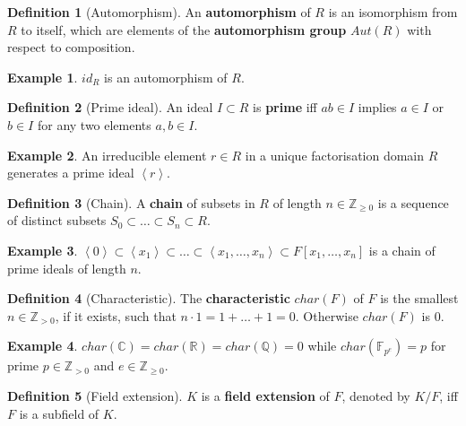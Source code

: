 \documentclass{article}
\newcommand{\F}{\mathbb{F}}
\newcommand{\Z}{\mathbb{Z}}
\newcommand{\Q}{\mathbb{Q}}
\newcommand{\R}{\mathbb{R}}
\newcommand{\C}{\mathbb{C}}
\newcommand{\rb}[1]{\left( #1 \right)}
\renewcommand{\sb}[1]{\left[ #1 \right]}
\newcommand{\ab}[1]{\left\langle #1 \right\rangle}
\theoremstyle{definition}
\newtheorem*{definition}{Definition}
\newtheorem*{example}{Example}
\begin{document}
\begin{definition}[Automorphism]
An \textbf{automorphism} of $ R $ is an isomorphism from $ R $ to itself, which are elements of the \textbf{automorphism group} $ Aut\rb{R} $ with respect to composition.
\end{definition}

\begin{example}
$ id_R $ is an automorphism of $ R $.
\end{example}

\begin{definition}[Prime ideal]
An ideal $ I \subset R $ is \textbf{prime} iff $ ab \in I $ implies $ a \in I $ or $ b \in I $ for any two elements $ a, b \in I $.
\end{definition}

\begin{example}
An irreducible element $ r \in R $ in a unique factorisation domain $ R $ generates a prime ideal $ \ab{r} $.
\end{example}

\begin{definition}[Chain]
A \textbf{chain} of subsets in $ R $ of length $ n \in \Z_{\ge 0} $ is a sequence of distinct subsets $ S_0 \subset \dots \subset S_n \subset R $.
\end{definition}

\begin{example}
$ \ab{0} \subset \ab{x_1} \subset \dots \subset \ab{x_1, \dots, x_n} \subset F\sb{x_1, \dots, x_n} $ is a chain of prime ideals of length $ n $.
\end{example}

\begin{definition}[Characteristic]
The \textbf{characteristic} $ char\rb{F} $ of $ F $ is the smallest $ n \in \Z_{> 0} $, if it exists, such that $ n \cdot 1 = 1 + \dots + 1 = 0 $. Otherwise $ char\rb{F} $ is $ 0 $.
\end{definition}

\begin{example}
$ char\rb{\C} = char\rb{\R} = char\rb{\Q} = 0 $ while $ char\rb{\F_{p^e}} = p $ for prime $ p \in \Z_{> 0} $ and $ e \in \Z_{\ge 0} $.
\end{example}

\begin{definition}[Field extension]
$ K $ is a \textbf{field extension} of $ F $, denoted by $ K / F $, iff $ F $ is a subfield of $ K $.
\end{definition}
\end{document}
